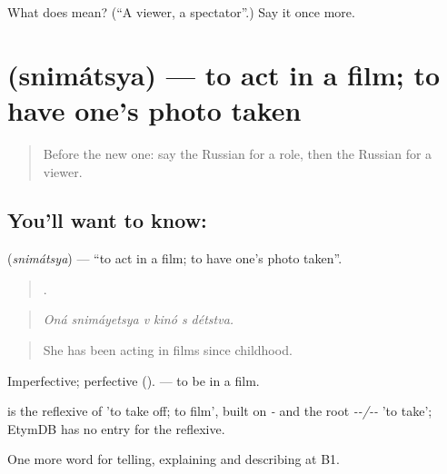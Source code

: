\begin{tcolorbox}[breakable,colback=teal!4,colframe=teal!35!black,title={Before you move on}]
What does  mean? (\textquotedblleft{}A viewer, a spectator\textquotedblright{}.) Say it once more.
\end{tcolorbox}
\section[\texorpdfstring{\ru{сниматься} (snimátsya)}{сниматься (snimátsya)}]{ (snimátsya) — to act in a film; to have one's photo taken}

\label{lesson:RU-C520-snimatsya}



\begin{quote}
Before the new one: say the Russian for a role, then the Russian for a viewer.
\end{quote}

\subsection*{You'll want to know: }
\textbf{} (\emph{snimátsya}) — \textquotedblleft{}to act in a film; to have one's photo taken\textquotedblright{}.

\begin{quote}
     .
\end{quote}

\begin{quote}
\emph{Oná snimáyetsya v kinó s détstva.}
\end{quote}

\begin{quote}
She has been acting in films since childhood.
\end{quote}

Imperfective; perfective  (). \emph{  } — to be in a film.

\begin{cousinweb}
\emph{} is the reflexive of \emph{} 'to take off; to film', built on \emph{-} and the root \emph{--/--} 'to take'; EtymDB has no entry for the reflexive.
\end{cousinweb}

\begin{grammarlens}[title={What you've built}]
One more word for telling, explaining and describing at B1.
\end{grammarlens}

